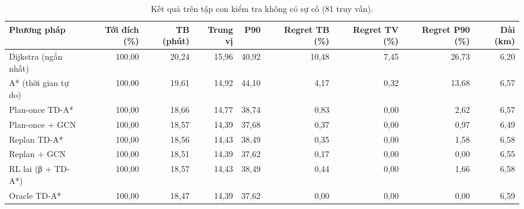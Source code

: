 \begin{table}[!htbp]
\centering
\small
\caption{Kết quả trên tập con kiểm tra không có sự cố (81 truy vấn).}
\label{tab:tab_results_noinc}
\begin{adjustbox}{max width=\linewidth}
\begin{tabular}{lrrrrrrrr}
\toprule
Phương pháp & Tới đích (\%) & TB (phút) & Trung vị & P90 & Regret TB (\%) & Regret TV (\%) & Regret P90 (\%) & Dài (km) \\
\midrule
Dijkstra (ngắn nhất) & 100{,}00 & 20{,}24 & 15{,}96 & 40{,}92 & 10{,}48 & 7{,}45 & 26{,}73 & 6{,}20 \\
A* (thời gian tự do) & 100{,}00 & 19{,}61 & 14{,}92 & 44{,}10 & 4{,}17 & 0{,}32 & 13{,}68 & 6{,}57 \\
Plan-once TD-A* & 100{,}00 & 18{,}66 & 14{,}77 & 38{,}74 & 0{,}83 & 0{,}00 & 2{,}62 & 6{,}57 \\
Plan-once + GCN & 100{,}00 & 18{,}57 & 14{,}39 & 37{,}68 & 0{,}37 & 0{,}00 & 0{,}97 & 6{,}49 \\
Replan TD-A* & 100{,}00 & 18{,}56 & 14{,}43 & 38{,}49 & 0{,}35 & 0{,}00 & 1{,}58 & 6{,}58 \\
Replan + GCN & 100{,}00 & 18{,}51 & 14{,}39 & 37{,}62 & 0{,}17 & 0{,}00 & 0{,}00 & 6{,}55 \\
RL lai (β + TD-A*) & 100{,}00 & 18{,}57 & 14{,}43 & 38{,}49 & 0{,}44 & 0{,}00 & 1{,}66 & 6{,}58 \\
Oracle TD-A* & 100{,}00 & 18{,}47 & 14{,}39 & 37{,}62 & 0{,}00 & 0{,}00 & 0{,}00 & 6{,}59 \\
\bottomrule
\end{tabular}
\end{adjustbox}
\end{table}
